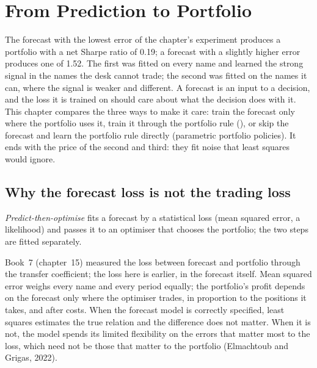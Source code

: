 \chapter{From Prediction to Portfolio}\label{ch:ml:from-prediction-to-portfolio}

The forecast with the lowest error of the chapter's experiment produces a portfolio with a net Sharpe ratio of 0.19; a
forecast with a slightly higher error produces one of 1.52. The first was fitted on every name and learned the strong
signal in the names the desk cannot trade; the second was fitted on the names it can, where the signal is weaker and
different. A forecast is an input to a decision, and the loss it is trained on should care about what the decision does
with it. This chapter compares the three ways to make it care: train the forecast only where the portfolio uses it, train
it through the portfolio rule (), or skip the forecast and learn the portfolio rule directly
(parametric portfolio policies). It ends with the price of the second and third: they fit noise that least squares would
ignore.

\section{Why the forecast loss is not the trading loss}

\begin{definition}\label{def:ml:from-prediction-to-portfolio:pto}
\emph{Predict-then-optimise} fits a forecast by a statistical loss (mean squared error, a
likelihood) and passes it to an optimiser that chooses the portfolio; the two steps are fitted separately.
\end{definition}

Book~7 (chapter~15) measured the loss between forecast and portfolio through the transfer coefficient; the loss here is
earlier, in the forecast itself. Mean squared error weighs every name and every period equally; the portfolio's profit
depends on the forecast only where the optimiser trades, in proportion to the positions it takes, and after costs. When the
forecast model is correctly specified, least squares estimates the true relation and the difference does not matter. When it
is not, the model spends its limited flexibility on the errors that matter most to the loss, which need not be those that
matter to the portfolio (Elmachtoub and Grigas, 2022).

